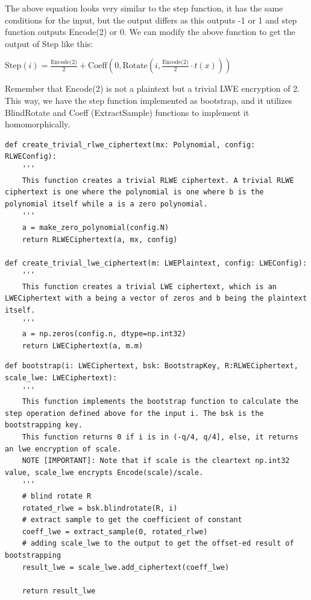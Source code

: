 \documentclass{report}
\begin{document}
The above equation looks very similar to the step function, it has the same conditions for the input, but the output differs as this outputs -1 or 1 and step function outputs Encode(2) or 0. We can modify the above function to get the output of Step like this:
\begin{center}
	$\text{Step}(i) = \frac{\text{Encode(2)}}{2} + \text{Coeff}(0, \text{Rotate}(i, \frac{\text{Encode(2)}}{2} \cdot t(x)))$
\end{center}
Remember that Encode(2) is not a plaintext but a trivial LWE encryption of 2. This way, we have the step function implemented as bootstrap, and it utilizes BlindRotate and Coeff (ExtractSample) functions to implement it homomorphically.

\begin{verbatim}
def create_trivial_rlwe_ciphertext(mx: Polynomial, config: RLWEConfig):
	'''
	This function creates a trivial RLWE ciphertext. A trivial RLWE ciphertext is one where the polynomial is one where b is the polynomial itself while a is a zero polynomial.
	'''
	a = make_zero_polynomial(config.N)
	return RLWECiphertext(a, mx, config)
	
def create_trivial_lwe_ciphertext(m: LWEPlaintext, config: LWEConfig):
	'''
	This function creates a trivial LWE ciphertext, which is an LWECiphertext with a being a vector of zeros and b being the plaintext itself.
	'''
	a = np.zeros(config.n, dtype=np.int32)
	return LWECiphertext(a, m.m)
\end{verbatim}

\begin{verbatim}
def bootstrap(i: LWECiphertext, bsk: BootstrapKey, R:RLWECiphertext, scale_lwe: LWECiphertext):
	'''
	This function implements the bootstrap function to calculate the step operation defined above for the input i. The bsk is the bootstrapping key.
	This function returns 0 if i is in (-q/4, q/4], else, it returns an lwe encryption of scale.
	NOTE [IMPORTANT]: Note that if scale is the cleartext np.int32 value, scale_lwe encrypts Encode(scale)/scale.
	'''
	# blind rotate R
	rotated_rlwe = bsk.blindrotate(R, i)
	# extract sample to get the coefficient of constant
	coeff_lwe = extract_sample(0, rotated_rlwe)
	# adding scale_lwe to the output to get the offset-ed result of bootstrapping
	result_lwe = scale_lwe.add_ciphertext(coeff_lwe)
	
	return result_lwe
\end{verbatim}
\end{document}
